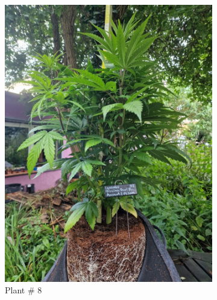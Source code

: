 \begin{figure}[htbp]
\begin{subfigure}[t]{.28\textwidth}
        \includegraphics[width=\linewidth]{plant_08_2024-06-17}
        \caption{Plant \# 8}
        \label{fig:plant_08_2024-06-17}
    \end{subfigure}
    \begin{subfigure}[t]{.28\textwidth}

\end{subfigure}
\end{figure}
